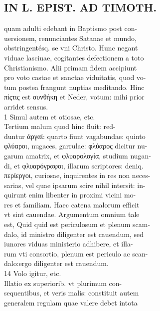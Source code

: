 \documentclass{article}
\begin{document}
\begin{pages}
\section*{IN L. EPIST. AD TIMOTH. \\
                }
quam adulti edebant in Baptismo post con- \\
                uersionem, renunciantes Satanae et mundo, \\
                obstringentésq. se vni Christo. Hunc negant \\
                viduae lasciuae, cogitantes defectionem a toto \\
                Christianismo. Alii primam fidem accipiunt \\
                pro voto castae et sanctae viduitatis, quod vo- \\
                tum postea frangunt nuptias meditando. Hinc \\
                πίςτις est συνθήκη et Neder, votum: mihi prior \\
                arridet sensus. \\
                1 Simul autem et otiosae, etc. \\
                Tertium malum quod hinc fluit: red- \\
                duntur ἀργαί: quarto fiunt vagabundae: quinto \\
                φλύαροι, nugaces, garrulae: φλύαρος dicitur nu- \\
                garum amatrix, et φλυαρολογία, studium nugan- \\
                di, et φλυαρόγραφοι, illarum scriptores: deniq. \\
                περίεργοι, curiosae, inquirentes in res non neces- \\
                sarias, vel quae ipsarum scire nihil intersit: in- \\
                quirunt enim libenter in proximi vicini mo- \\
                res et familiam. Haec catena malorum efficit \\
                vt sint cauendae. Argumentum omnium tale \\
                est, Quid quid est periculosum et plenum scam- \\
                dalo, id ministro diligenter est cauendum, sed \\
                iunores viduas ministerio adhibere, et illa- \\
                rum vti consortio, plenum est periculo ac scan- \\
                dalo:ergo diligenter est cauendum. \\
                14 Volo igitur, etc. \\
                Illatio ex superiorib. vt plurimum con- \\
                sequentibus, et veris malis: constituit autem \\
                generalem regulam quae valere debet intota \\
                

\end{pages}
\end{document}
